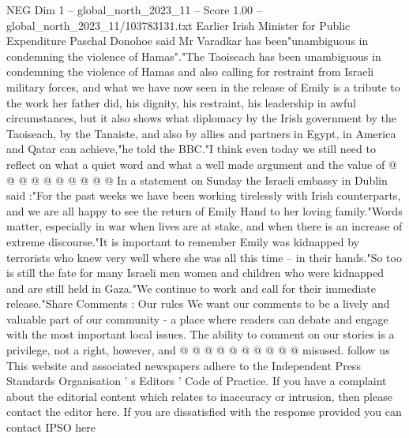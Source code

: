 \begin{textsample}{NEG Dim 1 – global\_north\_2023\_11 – Score 1.00 – global\_north\_2023\_11/103783131.txt}
Earlier Irish Minister for Public Expenditure Paschal Donohoe said Mr Varadkar has been"unambiguous in condemning the violence of Hamas"."The Taoiseach has been unambiguous in condemning the violence of Hamas and also calling for restraint from Israeli military forces, and what we have now seen in the release of Emily is a tribute to the work her father did, his dignity, his restraint, his leadership in awful circumstances, but it also shows what diplomacy by the Irish government by the Taoiseach, by the Tanaiste, and also by allies and partners in Egypt, in America and Qatar can achieve,"he told the BBC."I think even today we still need to reflect on what a quiet word and what a well made argument and the value of @ @ @ @ @ @ @ @ @ @ In a statement on Sunday the Israeli embassy in Dublin said :"For the past weeks we have been working tirelessly with Irish counterparts, and we are all happy to see the return of Emily Hand to her loving family."Words matter, especially in war when lives are at stake, and when there is an increase of extreme discourse."It is important to remember Emily was kidnapped by terrorists who knew very well where she was all this time -- in their hands."So too is still the fate for many Israeli men women and children who were kidnapped and are still held in Gaza."We continue to work and call for their immediate release."Share Comments : Our rules We want our comments to be a lively and valuable part of our community - a place where readers can debate and engage with the most important local issues.
The ability to comment on our stories is a privilege, not a right, however, and @ @ @ @ @ @ @ @ @ @ misused. follow us This website and associated newspapers adhere to the Independent Press Standards Organisation ' s Editors ' Code of Practice.
If you have a complaint about the editorial content which relates to inaccuracy or intrusion, then please contact the editor here.
If you are dissatisfied with the response provided you can contact IPSO here

\end{textsample}
